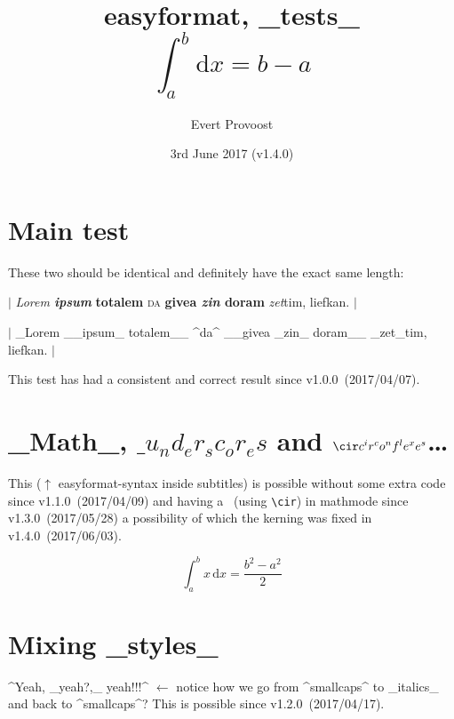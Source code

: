 \documentclass[11pt]{article}
\title{\vspace{-4em}\textsf{easyformat}, _tests_\\$$ \int_a^b \mathrm{d}x = b - a $$}
\author{Evert Provoost}
\date{3rd June 2017 (v1.4.0)}
\begin{document}
	\enableeasyformat %

	\maketitle
	\tableofcontents
	\vspace{2em}

	\section{Main test}
	These two should be identical and definitely have the exact same length:

	$|$ \textit{Lorem \textbf{ipsum}}\textbf{ totalem} \textsc{da} \textbf{givea \textit{zin} doram} \textit{zet}tim, liefkan. $|$

	$|$ _Lorem __ipsum_ totalem__ ^da^ __givea _zin_ doram__ _zet_tim, liefkan. $|$
	
	\noindent This test has had a consistent and correct result since v1.0.0~(2017/04/07).

	\section{_Math_, $\_ u_nd_er_sc_or_es$ and $\cir c^ir^co^nf^le^xe^s$\dots}
	This ($\uparrow$ \textsf{easyformat}-syntax inside subtitles) is possible without some extra code since v1.1.0~(2017/04/09) and having a \cir\ (using \verb|\cir|) in mathmode since v1.3.0~(2017/05/28) a possibility of which the kerning was fixed in v1.4.0~(2017/06/03).
	
	$$ \int_a^b x\,\mathrm{d}x = \frac{b^2 - a^2}{2} $$
	
	\section{Mixing _styles_}
	^Yeah, _yeah?,_ yeah!!!^
	$\leftarrow$ notice how we go from ^smallcaps^ to _italics_ and back to ^smallcaps^? This is possible since v1.2.0~(2017/04/17).
\end{document}
